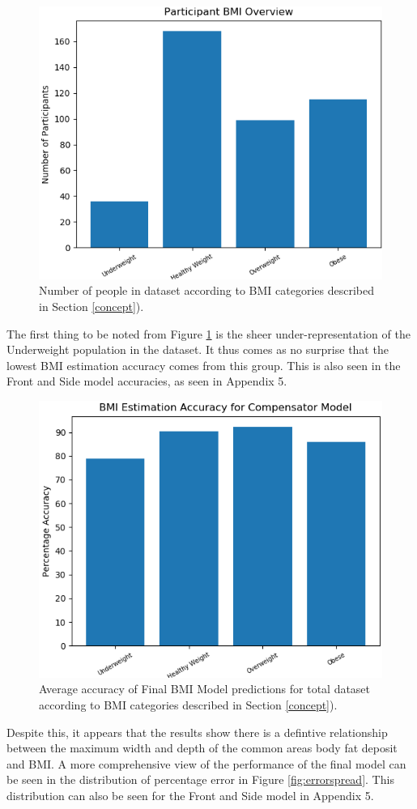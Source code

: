 \documentclass[conference]{IEEEtran}
\begin{document}
\begin{figure}
	\centering
	\includegraphics[width=0.7\linewidth]{spread.png}
	\caption{Number of people in dataset according to BMI categories described in Section \ref{concept}).}
	\label{fig:spread}
\end{figure}

The first thing to be noted from Figure \ref{fig:spread} is the sheer under-representation of the Underweight population in the dataset.
It thus comes as no surprise that the lowest BMI estimation accuracy comes from this group.
This is also seen in the Front and Side model accuracies, as seen in Appendix 5.

\begin{figure}
	\centering
	\includegraphics[width=0.7\linewidth]{accuracies.png}
	\caption{Average accuracy of Final BMI Model predictions for total dataset according to BMI categories described in Section \ref{concept}).}
	\label{fig:accuracies}
\end{figure}

Despite this, it appears that the results show there is a defintive relationship between the maximum width and depth of the common areas body fat deposit and BMI.
A more comprehensive view of the performance of the final model can be seen in the distribution of percentage error in Figure \ref{fig:errorspread}.
This distribution can also be seen for the Front and Side model in Appendix 5.
\end{document}
